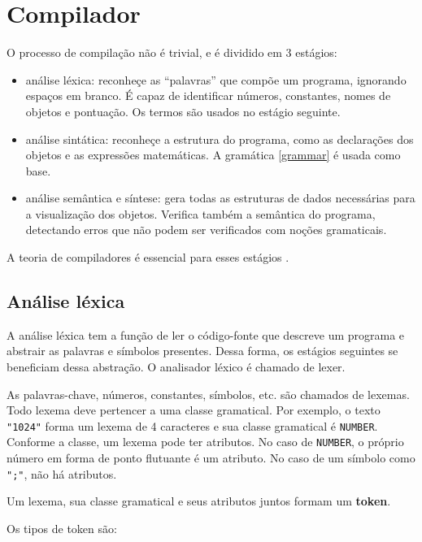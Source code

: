 \chapter{Compilador}
\label{comp}

O processo de compilação não é trivial, e é dividido em 3 estágios:
\begin{itemize}
    \item análise léxica: reconheçe as ``palavras'' que compõe um programa,
    ignorando espaços em branco. É capaz de identificar números, 
    constantes, nomes de objetos e pontuação.
    Os termos são usados no estágio seguinte.

    \item análise sintática: reconheçe a estrutura do programa, como
    as declarações dos objetos e as expressões matemáticas.
    A gramática \ref{grammar} é usada como base.

    \item análise semântica e síntese: gera todas as estruturas de dados
    necessárias para a visualização dos objetos.
    Verifica também a semântica do programa,
    detectando erros que não podem ser verificados com noções gramaticais.
\end{itemize}

A teoria de compiladores é essencial para esses estágios \cite{Dragon:1}.

\section{Análise léxica}
A análise léxica tem a função de ler o código-fonte que descreve um programa
e abstrair as palavras e símbolos presentes.
Dessa forma, os estágios seguintes se beneficiam dessa abstração.
O analisador léxico é chamado de lexer.

As palavras-chave, números, constantes, símbolos, etc. são chamados de lexemas.
Todo lexema deve pertencer a uma classe gramatical.
Por exemplo, o texto \texttt{"1024"} forma um lexema de 4 caracteres
e sua classe gramatical é \texttt{NUMBER}.
Conforme a classe, um lexema pode ter atributos.
No caso de \texttt{NUMBER}, o próprio número em forma de ponto flutuante é um atributo.
No caso de um símbolo como \texttt{";"}, não há atributos.

Um lexema, sua classe gramatical e seus atributos juntos formam um \textbf{token}.

Os tipos de token são:


